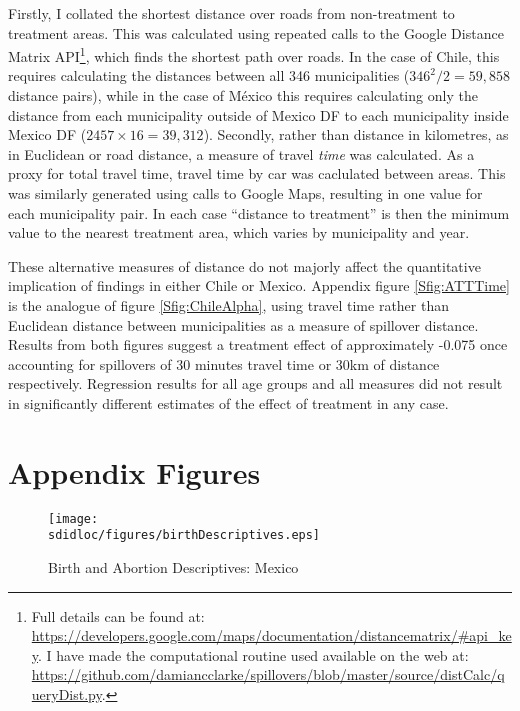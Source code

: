 Firstly, I collated the shortest distance over roads from non-treatment to 
treatment areas.  This was calculated using repeated calls to the Google 
Distance Matrix API\footnote{Full details can be found at:
\url{https://developers.google.com/maps/documentation/distancematrix/\#api\_key}.
I have made the computational routine used available on the web at:
\url{https://github.com/damiancclarke/spillovers/blob/master/source/distCalc/queryDist.py}.}, 
which finds the shortest path over roads.  In the case of Chile, this requires 
calculating the distances between all 346  municipalities ($346^2/2=59,858$ 
distance pairs), while in the case of M\'exico this requires calculating only 
the distance from each municipality outside of Mexico DF to each municipality 
inside Mexico DF ($2457\times 16=39,312$).  Secondly, rather than distance in 
kilometres, as in Euclidean or road distance, a measure of travel \emph{time} 
was calculated.  As a proxy for total travel time, travel time by car was 
caclulated between areas.  This was similarly generated using calls to Google 
Maps, resulting in one value for each municipality pair.  In each case 
``distance to treatment'' is then the minimum value to the nearest treatment 
area, which varies by municipality and year.

These alternative measures of distance do not majorly affect the quantitative 
implication of findings in either Chile or Mexico.  Appendix figure 
\ref{Sfig:ATTTime} is the analogue of figure \ref{Sfig:ChileAlpha},
using travel time rather than Euclidean distance between municipalities as
a measure of spillover distance.  Results from both figures suggest a 
treatment effect of approximately -0.075 once accounting for spillovers of
30 minutes travel time or 30km of distance respectively.  Regression results
for all age groups and all measures did not result in significantly different
estimates of the effect of treatment in any case.

\clearpage


\section{Appendix Figures}
\label{Sscn:Agraphs}
\begin{figure}[h!]
\texttt{[image: \\sdidloc/figures/birthDescriptives.eps]}
\caption{Birth and Abortion Descriptives: Mexico}
\label{SFig:MexBirthAbort}
\vspace{2mm}
\end{figure}


